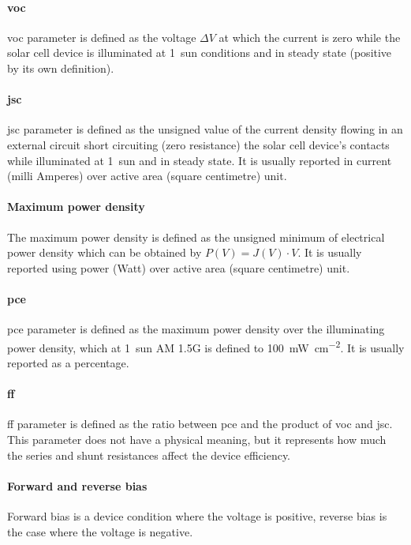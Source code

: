 		\paragraph{\Glsdesc{voc}} \Gls{voc} parameter is defined as the voltage $\Delta V$ at which the current is zero while the solar cell device is illuminated at 1~sun conditions and in steady state (positive by its own definition).

		\paragraph{\Glsdesc{jsc}} \Gls{jsc} parameter is defined as the unsigned value of the current density flowing in an external circuit short circuiting (zero resistance) the solar cell device's contacts while illuminated at 1~sun and in steady state. It is usually reported in current (milli Amperes) over active area (square centimetre) unit.

		\paragraph{Maximum power density} The maximum power density is defined as the unsigned minimum of electrical power density which can be obtained by $P(V) = J(V) \cdot V$. It is usually reported using power (Watt) over active area (square centimetre) unit.

		\paragraph{\Glsdesc{pce}} \Gls{pce} parameter is defined as the maximum power density over the illuminating power density, which at 1~sun AM 1.5G is defined to \SI{100}{\mW\per\square\cm}. It is usually reported as a percentage.

		\paragraph{\Glsdesc{ff}} \Gls{ff} parameter is defined as the ratio between \gls{pce} and the product of \gls{voc} and \gls{jsc}. This parameter does not have a physical meaning, but it represents how much the series and shunt resistances affect the device efficiency.

		\paragraph{Forward and reverse bias} Forward bias is a device condition where the voltage is positive, reverse bias is the case where the voltage is negative.


